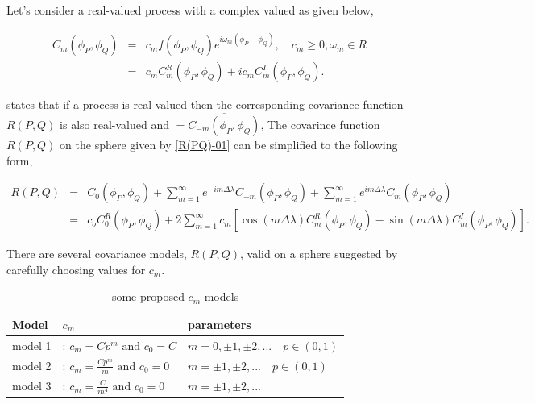 			
					
			Let's consider a real-valued process with a complex valued \Cm as given below,
			
			\begin{eqnarray*}
				C_m(\phi_P,\phi_Q) &=& c_m f(\phi_P,\phi_Q)e^{i\omega_m(\phi_P-\phi_Q)}, \quad c_m \ge 0,\omega_m\in R \\
				&=& c_mC_m^{R}(\phi_P,\phi_Q) + i c_mC_m^{I}(\phi_P,\phi_Q).
			\end{eqnarray*}
			
			\cite{Huang2012} states that if a process is real-valued then the corresponding covariance function $R(P,Q)$ is also real-valued and \Cm $= \overline{C_{-m}(\phi_P,\phi_Q)}$, The covarince function $R(P,Q)$ on the sphere given by \ref{R(PQ)-01} can be simplified to the following form,
					
			
			\begin{eqnarray*}
				R(P,Q) &=& C_0(\phi_P,\phi_Q) + \sum_{m=1}^{\infty} e^{-im\Delta\lambda}C_{-m}(\phi_P,\phi_Q) +  \sum_{m=1}^{\infty} e^{im\Delta\lambda}C_m(\phi_P,\phi_Q) \\ 
				&=& c_oC_{0}^{R}(\phi_P,\phi_Q)+2 \sum_{m=1}^{\infty}c_m[\cos(m\Delta\lambda)C_{m}^{R}(\phi_P,\phi_Q)-\sin(m\Delta\lambda)C_{m}^{I}(\phi_P,\phi_Q)].
			\end{eqnarray*}
			
			
			There are several covariance models, $R(P,Q)$, valid on a sphere suggested by \cite{Huang2012}  carefully choosing values for $c_m$.
					
					
			\begin{table}[H]
				\centering
				\begin{tabular}{l|l|l}
					\hline
					Model   & $c_m$                                         & parameters                               \\ 
					\hline \hline
					model 1 & : $c_m = Cp^m  \mbox{ and } c_0 = C$          & $m=0, \pm 1, \pm 2,... \quad p\in (0,1)$ \\
					model 2 & : $c_m = \frac{Cp^m}{m} \mbox{ and } c_0 = 0$ & $m=\pm 1, \pm 2,... \quad p\in (0,1)$    \\
					model 3 & : $c_m = \frac{C}{m^4} \mbox{ and } c_0 = 0$  & $m=\pm 1, \pm 2,...$                     \\
					\hline
				\end{tabular}
				\label{Cm_table}
				\caption{some proposed $c_m$ models}
			\end{table}
						
